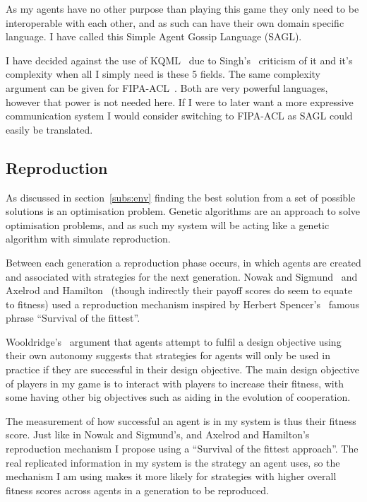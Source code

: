 \documentclass[]{final_report}
\begin{document}
As my agents have no other purpose than playing this game they only need to be interoperable with each other, and as such can have their own domain specific language. I have called this Simple Agent Gossip Language (SAGL).\par
I have decided against the use of KQML~\cite{finin1994kqml} due to Singh's~\cite{singh1998agent} criticism of it and it's complexity when all I simply need is these 5 fields. The same complexity argument can be given for FIPA-ACL~\cite{o1998fipa}. Both are very powerful languages, however that power is not needed here. If I were to later want a more expressive communication system I would consider switching to FIPA-ACL as SAGL could easily be translated.


\subsection{Reproduction}
\label{subs:reproduction}
As discussed in section~\ref{subs:env} finding the best solution from a set of possible solutions is an optimisation problem. Genetic algorithms are an approach to solve optimisation problems, and as such my system will be acting like a genetic algorithm with simulate reproduction.\par
Between each generation a reproduction phase occurs, in which agents are created and associated with strategies for the next generation. Nowak and Sigmund~\cite{evol_indirect_image} and Axelrod and Hamilton~\cite{evolution_of_cooperation} (though indirectly their payoff scores do seem to equate to fitness) used a reproduction mechanism inspired by Herbert Spencer's~\cite{spencer1864principles} famous phrase ``Survival of the fittest''.\par
Wooldridge's~\cite{wooldridge2009introduction} argument that agents attempt to fulfil a design objective using their own autonomy suggests that strategies for agents will only be used in practice if they are successful in their design objective. The main design objective of players in my game is to interact with players to increase their fitness, with some having other big objectives such as aiding in the evolution of cooperation.\par
The measurement of how successful an agent is in my system is thus their fitness score. Just like in Nowak and Sigmund's, and Axelrod and Hamilton's reproduction mechanism I propose using a ``Survival of the fittest approach''. The real replicated information in my system is the strategy an agent uses, so the mechanism I am using makes it more likely for strategies with higher overall fitness scores across agents in a generation to be reproduced.\par
\end{document}
